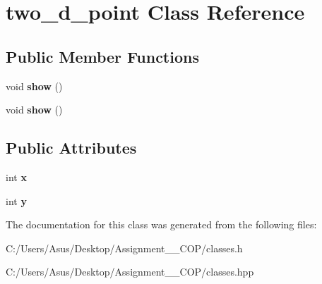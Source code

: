 \hypertarget{classtwo__d__point}{}\section{two\+\_\+d\+\_\+point Class Reference}
\label{classtwo__d__point}
\subsection*{Public Member Functions}
\begin{DoxyCompactItemize}
\item 
\mbox{\label{classtwo__d__point_a58931c2c5f9a9f405625bce2cf880400}} 
void {\bfseries show} ()
\item 
\mbox{\label{classtwo__d__point_a58931c2c5f9a9f405625bce2cf880400}} 
void {\bfseries show} ()
\end{DoxyCompactItemize}
\subsection*{Public Attributes}
\begin{DoxyCompactItemize}
\item 
\mbox{\label{classtwo__d__point_aa5d318669fb5ce39647ac3f9d8de8f9e}} 
int {\bfseries x}
\item 
\mbox{\label{classtwo__d__point_ac9899e7f7adbe4a67cb23ac57deb6a58}} 
int {\bfseries y}
\end{DoxyCompactItemize}


The documentation for this class was generated from the following files\+:\begin{DoxyCompactItemize}
\item 
C\+:/\+Users/\+Asus/\+Desktop/\+Assignment\+\_\+\_\+\+C\+O\+P/classes.\+h\item 
C\+:/\+Users/\+Asus/\+Desktop/\+Assignment\+\_\+\_\+\+C\+O\+P/classes.\+hpp\end{DoxyCompactItemize}
